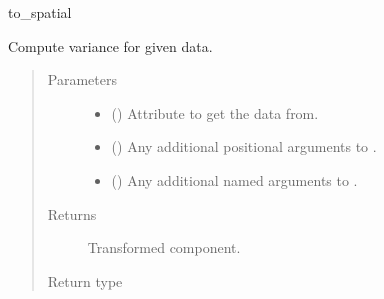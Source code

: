\documentclass[letterpaper,10pt,english]{sphinxmanual}
\begin{document}
\begin{fulllineitems}
\begin{fulllineitems}
to\_spatial

\end{fulllineitems}


\begin{fulllineitems}
\label{\detokenize{api/states:geology.src.States.variance}}
Compute variance for given data.
\begin{quote}\begin{description}
\item[{Parameters}] \leavevmode\begin{itemize}
\item {} 
 (\sphinxstyleliteralemphasis{\sphinxupquote{, }}) \textendash{} Attribute to get the data from.

\item {} 
 () \textendash{} Any additional positional arguments to .

\item {} 
 () \textendash{} Any additional named arguments to .

\end{itemize}

\item[{Returns}] \leavevmode
{} \textendash{} Transformed component.

\item[{Return type}] \leavevmode
{\hyperref[\detokenize{api/base_classes:geology.src.base_spatial.SpatialComponent}]{}}

\end{description}\end{quote}

\end{fulllineitems}


\end{fulllineitems}
\end{document}
